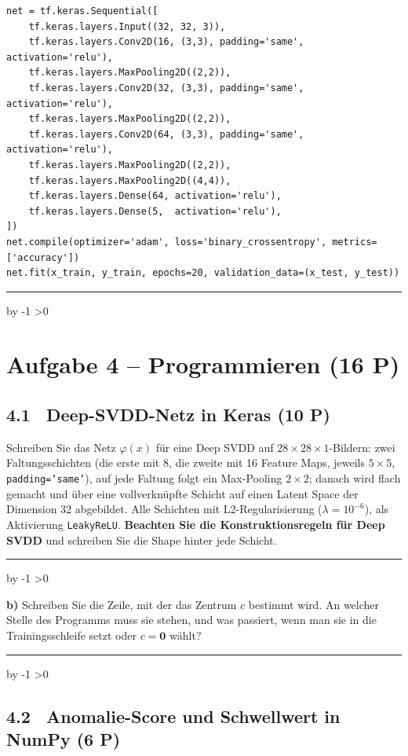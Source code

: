\documentclass[10pt,a4paper]{article}
\newcommand{\antwortlinien}[1]{%
  \par\vspace{2pt}%
  \newcount\zeilen \zeilen=#1
  \loop
    \noindent\rule{\linewidth}{0.4pt}\par\vspace{11pt}%
    \advance\zeilen by -1
  \ifnum\zeilen>0 \repeat
}
\newcommand{\pkt}[1]{\hfill\textbf{(#1 P)}}
\begin{document}
\begin{lstlisting}
net = tf.keras.Sequential([
    tf.keras.layers.Input((32, 32, 3)),
    tf.keras.layers.Conv2D(16, (3,3), padding='same', activation='relu'),
    tf.keras.layers.MaxPooling2D((2,2)),
    tf.keras.layers.Conv2D(32, (3,3), padding='same', activation='relu'),
    tf.keras.layers.MaxPooling2D((2,2)),
    tf.keras.layers.Conv2D(64, (3,3), padding='same', activation='relu'),
    tf.keras.layers.MaxPooling2D((2,2)),
    tf.keras.layers.MaxPooling2D((4,4)),
    tf.keras.layers.Dense(64, activation='relu'),
    tf.keras.layers.Dense(5,  activation='relu'),
])
net.compile(optimizer='adam', loss='binary_crossentropy', metrics=['accuracy'])
net.fit(x_train, y_train, epochs=20, validation_data=(x_test, y_test))
\end{lstlisting}

\antwortlinien{8}

\newpage
\section*{Aufgabe 4 -- Programmieren \pkt{16}}

\subsection*{4.1 \ Deep-SVDD-Netz in Keras \pkt{10}}

Schreiben Sie das Netz $\varphi(x)$ für eine Deep SVDD auf $28\times28\times1$-Bildern:
zwei Faltungsschichten (die erste mit 8, die zweite mit 16 Feature Maps, jeweils $5\times5$,
\texttt{padding='same'}), auf jede Faltung folgt ein Max-Pooling $2\times2$; danach wird flach
gemacht und über eine vollverknüpfte Schicht auf einen Latent Space der Dimension 32 abgebildet.
Alle Schichten mit L2-Regularisierung ($\lambda = 10^{-6}$), als Aktivierung
\texttt{LeakyReLU}. \textbf{Beachten Sie die Konstruktionsregeln für Deep SVDD} und schreiben Sie
die Shape hinter jede Schicht.

\antwortlinien{12}

\textbf{b)} Schreiben Sie die Zeile, mit der das Zentrum $c$ bestimmt wird. An welcher Stelle des
Programms muss sie stehen, und was passiert, wenn man sie in die Trainingsschleife setzt oder
$c = \mathbf{0}$ wählt?
\antwortlinien{4}

\newpage
\subsection*{4.2 \ Anomalie-Score und Schwellwert in NumPy \pkt{6}}
\end{document}
